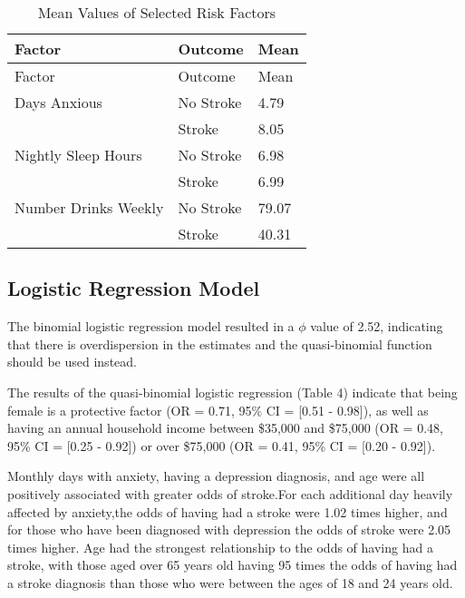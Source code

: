 \documentclass[11pt,]{article}
\begin{document}
\begin{longtable}[]{@{}lll@{}}
\caption{Mean Values of Selected Risk Factors}\tabularnewline
\toprule
Factor & Outcome & Mean\tabularnewline
\midrule
\endfirsthead
\toprule
Factor & Outcome & Mean\tabularnewline
\midrule
\endhead
Days Anxious & No Stroke & 4.79\tabularnewline
& Stroke & 8.05\tabularnewline
Nightly Sleep Hours & No Stroke & 6.98\tabularnewline
& Stroke & 6.99\tabularnewline
Number Drinks Weekly & No Stroke & 79.07\tabularnewline
& Stroke & 40.31\tabularnewline
\bottomrule
\end{longtable}

\subsection{Logistic Regression
Model}\label{logistic-regression-model-1}

The binomial logistic regression model resulted in a \(\phi\) value of
2.52, indicating that there is overdispersion in the estimates and the
quasi-binomial function should be used instead.

The results of the quasi-binomial logistic regression (Table 4) indicate
that being female is a protective factor (OR = 0.71, 95\% CI = {[}0.51 -
0.98{]}), as well as having an annual household income between \$35,000
and \$75,000 (OR = 0.48, 95\% CI = {[}0.25 - 0.92{]}) or over \$75,000
(OR = 0.41, 95\% CI = {[}0.20 - 0.92{]}).

Monthly days with anxiety, having a depression diagnosis, and age were
all positively associated with greater odds of stroke.For each
additional day heavily affected by anxiety,the odds of having had a
stroke were 1.02 times higher, and for those who have been diagnosed
with depression the odds of stroke were 2.05 times higher. Age had the
strongest relationship to the odds of having had a stroke, with those
aged over 65 years old having 95 times the odds of having had a stroke
diagnosis than those who were between the ages of 18 and 24 years old.
\end{document}
